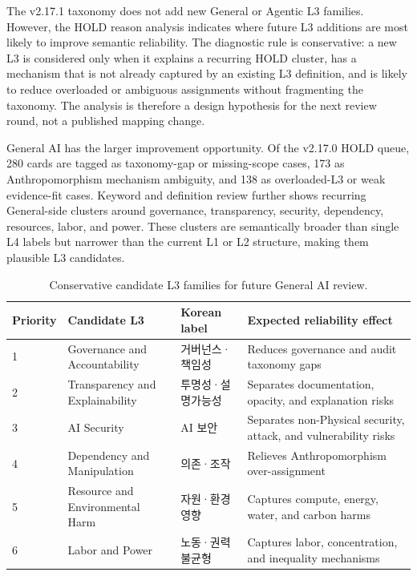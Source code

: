 \documentclass[11pt,a4paper]{article}
\begin{document}
The v2.17.1 taxonomy does not add new General or Agentic L3 families. However,
the HOLD reason analysis indicates where future L3 additions are most likely
to improve semantic reliability. The diagnostic rule is conservative: a new L3
is considered only when it explains a recurring HOLD cluster, has a mechanism
that is not already captured by an existing L3 definition, and is likely to
reduce overloaded or ambiguous assignments without fragmenting the taxonomy.
The analysis is therefore a design hypothesis for the next review round, not a
published mapping change.

General AI has the larger improvement opportunity. Of the v2.17.0 HOLD queue,
280 cards are tagged as taxonomy-gap or missing-scope cases, 173 as
Anthropomorphism mechanism ambiguity, and 138 as overloaded-L3 or weak
evidence-fit cases. Keyword and definition review further shows recurring
General-side clusters around governance, transparency, security, dependency,
resources, labor, and power. These clusters are semantically broader than
single L4 labels but narrower than the current L1 or L2 structure, making them
plausible L3 candidates.

\begin{table}[ht]
\centering
\caption{Conservative candidate L3 families for future General AI review.}
\label{tab:general-candidate-l3}
\begin{tabular}{llll}
\toprule
Priority & Candidate L3 & Korean label & Expected reliability effect \\
\midrule
1 & Governance and Accountability & 거버넌스·책임성 & Reduces governance and audit taxonomy gaps \\
2 & Transparency and Explainability & 투명성·설명가능성 & Separates documentation, opacity, and explanation risks \\
3 & AI Security & AI 보안 & Separates non-Physical security, attack, and vulnerability risks \\
4 & Dependency and Manipulation & 의존·조작 & Relieves Anthropomorphism over-assignment \\
5 & Resource and Environmental Harm & 자원·환경 영향 & Captures compute, energy, water, and carbon harms \\
6 & Labor and Power & 노동·권력 불균형 & Captures labor, concentration, and inequality mechanisms \\
\bottomrule
\end{tabular}
\end{table}
\end{document}

